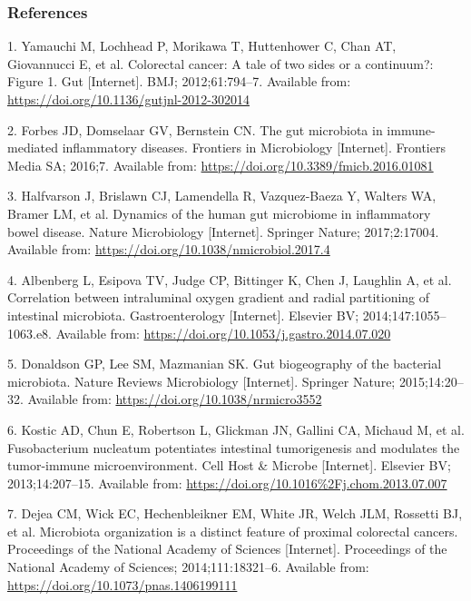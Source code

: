 \documentclass[12pt,]{article}
\begin{document}
\newpage

\subsubsection{References}\label{references}

\hypertarget{refs}{}
\hypertarget{ref-Yamauchi2012}{}
1. Yamauchi M, Lochhead P, Morikawa T, Huttenhower C, Chan AT,
Giovannucci E, et al. Colorectal cancer: A tale of two sides or a
continuum?: Figure 1. Gut {[}Internet{]}. BMJ; 2012;61:794--7. Available
from: \url{https://doi.org/10.1136/gutjnl-2012-302014}

\hypertarget{ref-Forbes2016}{}
2. Forbes JD, Domselaar GV, Bernstein CN. The gut microbiota in
immune-mediated inflammatory diseases. Frontiers in Microbiology
{[}Internet{]}. Frontiers Media SA; 2016;7. Available from:
\url{https://doi.org/10.3389/fmicb.2016.01081}

\hypertarget{ref-Halfvarson2017}{}
3. Halfvarson J, Brislawn CJ, Lamendella R, Vazquez-Baeza Y, Walters WA,
Bramer LM, et al. Dynamics of the human gut microbiome in inflammatory
bowel disease. Nature Microbiology {[}Internet{]}. Springer Nature;
2017;2:17004. Available from:
\url{https://doi.org/10.1038/nmicrobiol.2017.4}

\hypertarget{ref-Albenberg2014}{}
4. Albenberg L, Esipova TV, Judge CP, Bittinger K, Chen J, Laughlin A,
et al. Correlation between intraluminal oxygen gradient and radial
partitioning of intestinal microbiota. Gastroenterology {[}Internet{]}.
Elsevier BV; 2014;147:1055--1063.e8. Available from:
\url{https://doi.org/10.1053/j.gastro.2014.07.020}

\hypertarget{ref-Donaldson2015}{}
5. Donaldson GP, Lee SM, Mazmanian SK. Gut biogeography of the bacterial
microbiota. Nature Reviews Microbiology {[}Internet{]}. Springer Nature;
2015;14:20--32. Available from:
\url{https://doi.org/10.1038/nrmicro3552}

\hypertarget{ref-Kostic_2013}{}
6. Kostic AD, Chun E, Robertson L, Glickman JN, Gallini CA, Michaud M,
et al. Fusobacterium nucleatum potentiates intestinal tumorigenesis and
modulates the tumor-immune microenvironment. Cell Host \& Microbe
{[}Internet{]}. Elsevier BV; 2013;14:207--15. Available from:
\url{https://doi.org/10.1016\%2Fj.chom.2013.07.007}

\hypertarget{ref-Dejea2014}{}
7. Dejea CM, Wick EC, Hechenbleikner EM, White JR, Welch JLM, Rossetti
BJ, et al. Microbiota organization is a distinct feature of proximal
colorectal cancers. Proceedings of the National Academy of Sciences
{[}Internet{]}. Proceedings of the National Academy of Sciences;
2014;111:18321--6. Available from:
\url{https://doi.org/10.1073/pnas.1406199111}
\end{document}

